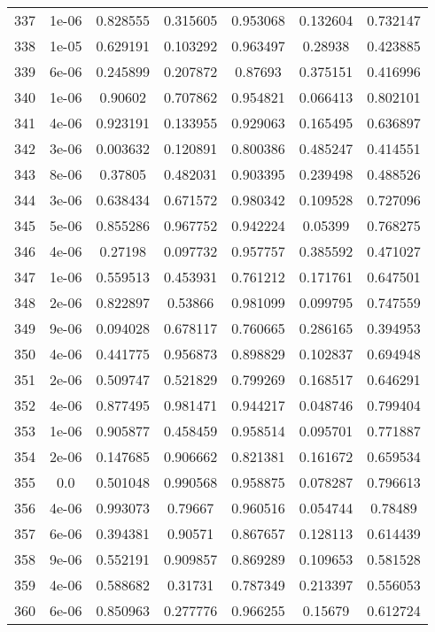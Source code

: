 \begin{table}
\begin{tabular*}{\linewidth}{c|c|c|c|c|c|c}
337 & 1e-06 & 0.828555 & 0.315605 & 0.953068 & 0.132604 & 0.732147\\
338 & 1e-05 & 0.629191 & 0.103292 & 0.963497 & 0.28938 & 0.423885\\
339 & 6e-06 & 0.245899 & 0.207872 & 0.87693 & 0.375151 & 0.416996\\
340 & 1e-06 & 0.90602 & 0.707862 & 0.954821 & 0.066413 & 0.802101\\
341 & 4e-06 & 0.923191 & 0.133955 & 0.929063 & 0.165495 & 0.636897\\
342 & 3e-06 & 0.003632 & 0.120891 & 0.800386 & 0.485247 & 0.414551\\
343 & 8e-06 & 0.37805 & 0.482031 & 0.903395 & 0.239498 & 0.488526\\
344 & 3e-06 & 0.638434 & 0.671572 & 0.980342 & 0.109528 & 0.727096\\
345 & 5e-06 & 0.855286 & 0.967752 & 0.942224 & 0.05399 & 0.768275\\
346 & 4e-06 & 0.27198 & 0.097732 & 0.957757 & 0.385592 & 0.471027\\
347 & 1e-06 & 0.559513 & 0.453931 & 0.761212 & 0.171761 & 0.647501\\
348 & 2e-06 & 0.822897 & 0.53866 & 0.981099 & 0.099795 & 0.747559\\
349 & 9e-06 & 0.094028 & 0.678117 & 0.760665 & 0.286165 & 0.394953\\
350 & 4e-06 & 0.441775 & 0.956873 & 0.898829 & 0.102837 & 0.694948\\
351 & 2e-06 & 0.509747 & 0.521829 & 0.799269 & 0.168517 & 0.646291\\
352 & 4e-06 & 0.877495 & 0.981471 & 0.944217 & 0.048746 & 0.799404\\
353 & 1e-06 & 0.905877 & 0.458459 & 0.958514 & 0.095701 & 0.771887\\
354 & 2e-06 & 0.147685 & 0.906662 & 0.821381 & 0.161672 & 0.659534\\
355 & 0.0 & 0.501048 & 0.990568 & 0.958875 & 0.078287 & 0.796613\\
356 & 4e-06 & 0.993073 & 0.79667 & 0.960516 & 0.054744 & 0.78489\\
357 & 6e-06 & 0.394381 & 0.90571 & 0.867657 & 0.128113 & 0.614439\\
358 & 9e-06 & 0.552191 & 0.909857 & 0.869289 & 0.109653 & 0.581528\\
359 & 4e-06 & 0.588682 & 0.31731 & 0.787349 & 0.213397 & 0.556053\\
360 & 6e-06 & 0.850963 & 0.277776 & 0.966255 & 0.15679 & 0.612724\\
\end{tabular*}
\end{table}

